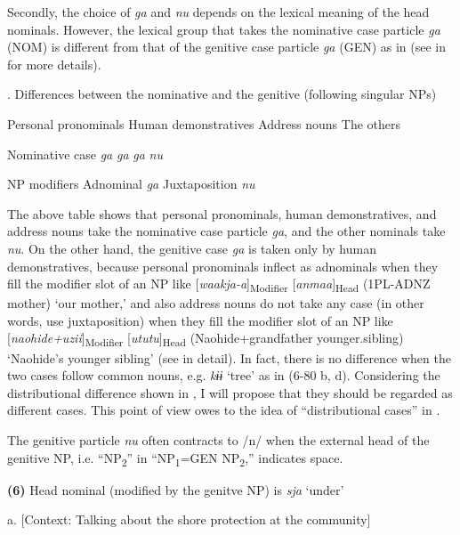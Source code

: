 Secondly, the choice of \textit{ga} and \textit{nu} depends on the lexical meaning of the head nominals. However, the lexical group that takes the nominative case particle \textit{ga} (NOM) is different from that of the genitive case particle \textit{ga} (GEN) as in  (see  in  for more details).

\begin{styleBeschriftung}
\textmd{. Differences between the nominative and the genitive (following singular NPs)}
\end{styleBeschriftung}

  Personal pronominals  Human demonstratives  Address nouns  The others

Nominative case  \textit{ga}  \textit{ga}  \textit{ga}  \textit{nu}

NP modifiers  Adnominal  \textit{ga}  Juxtaposition  \textit{nu}

The above table shows that personal pronominals, human demonstratives, and address nouns take the nominative case particle \textit{ga}, and the other nominals take \textit{nu}. On the other hand, the genitive case \textit{ga} is taken only by human demonstratives, because personal pronominals inflect as adnominals when they fill the modifier slot of an NP like [\textit{waakja-a}]\textsubscript{Modifier} [\textit{anmaa}]\textsubscript{Head} (1PL-ADNZ mother) ‘our mother,’ and also address nouns do not take any case (in other words, use juxtaposition) when they fill the modifier slot of an NP like [\textit{naohide+uzii}]\textsubscript{Modifier} [\textit{ututu}]\textsubscript{Head} (Naohide+grandfather younger.sibling) ‘Naohide’s younger sibling’ (see  in detail). In fact, there is no difference when the two cases follow common nouns, e.g. \textit{kɨɨ} ‘tree’ as in (6-80 b, d). Considering the distributional difference shown in , I will propose that they should be regarded as different cases. This point of view owes to the idea of “distributional cases” in \citet{Comrie1991}.

  The genitive particle \textit{nu} often contracts to /n/ when the external head of the genitive NP, i.e. “NP\textsubscript{2}” in “NP\textsubscript{1}=GEN NP\textsubscript{2},” indicates space.

\textbf{(6)}  Head nominal (modified by the genitve NP) is \textit{sja} ‘under’

  a.  [Context: Talking about the shore protection at the community]

